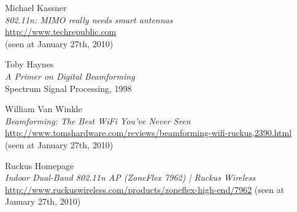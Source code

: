 \begin{thebibliography}{99}

Michael Kassner \\
\emph{802.11n: MIMO really needs smart antennas} \\
\url{http://www.techrepublic.com} \\
(seen at January 27th, 2010)

Toby Haynes\\
\emph{A Primer on Digital Beamforming} \\
Spectrum Signal Processing, 1998

William Van Winkle \\
\emph{Beamforming: The Best WiFi You've Never Seen} \\
\url{http://www.tomshardware.com/reviews/beamforming-wifi-ruckus,2390.html} \\
(seen at January 27th, 2010)

Ruckus Homepage \\
\emph{Indoor Dual-Band 802.11n AP (ZoneFlex 7962) |  Ruckus Wireless} \\
\url{http://www.ruckuswireless.com/products/zoneflex-high-end/7962}
(seen at January 27th, 2010)

\end{thebibliography}
